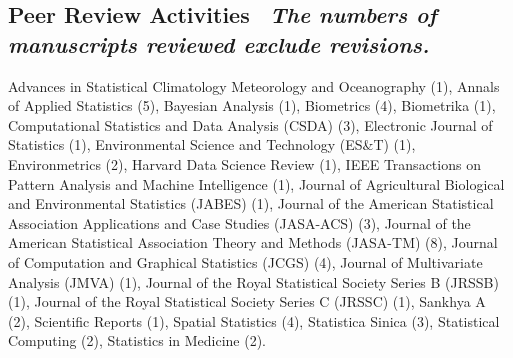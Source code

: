 \documentclass[12pt]{article}
\newcommand{\mylift}[1]{\vspace*{#1}}
\begin{document}
\subsection*{Peer Review Activities \ {\small \em  The numbers of manuscripts reviewed exclude revisions.}} \vskip -3mm
Advances in Statistical Climatology Meteorology and Oceanography (1), Annals of Applied Statistics (5), Bayesian Analysis (1), Biometrics (4), Biometrika (1), Computational Statistics and Data Analysis (CSDA) (3), Electronic Journal of Statistics (1), Environmental Science and Technology (ES\&T) (1), Environmetrics (2), Harvard Data Science Review (1), IEEE Transactions on Pattern Analysis and Machine Intelligence (1), Journal of Agricultural Biological and Environmental Statistics (JABES) (1), Journal of the American Statistical Association Applications and Case Studies (JASA-ACS) (3), Journal of the American Statistical Association Theory and Methods (JASA-TM) (8), Journal of Computation and Graphical Statistics (JCGS) (4), Journal of Multivariate Analysis (JMVA) (1), Journal of the Royal Statistical Society Series B (JRSSB) (1), 
Journal of the Royal Statistical Society Series C (JRSSC) (1), Sankhya A (2), Scientific Reports (1), Spatial Statistics (4), Statistica Sinica (3), Statistical Computing (2), Statistics in Medicine (2).
\mylift{-1.7em}
\end{document}
